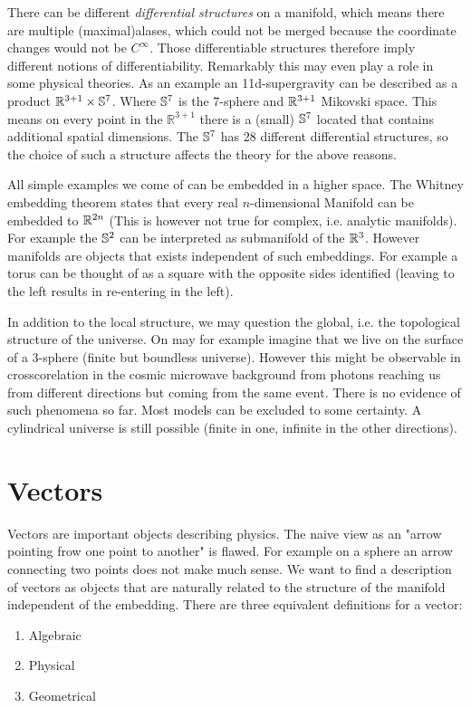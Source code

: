 \begin{sidenote}
There can be different \emph{differential structures} on a manifold, 
which means there are multiple (maximal)alases, which
could not be merged because the coordinate changes would not be $C^\infty$. Those differentiable structures therefore imply different notions of differentiability. 
Remarkably this may even play a role in some physical theories. 
As an example an 11d-supergravity can be described as a product
$\mathbb{R}^{3+1}\times \mathbb{S}^7$.
Where $\mathbb{S}^7$ is the 7-sphere and $\mathbb{R}^{3+1}$ Mikovski space.
This means on every point in the $\mathbb{R}^{3+1}$ there is a (small) $\mathbb{S}^7$  located that contains additional spatial dimensions. 
The $\mathbb{S}^7$ has 28 different differential structures, so the choice of
such a structure affects the theory for the above reasons.
\end{sidenote}
All simple examples we come of can be embedded in a higher space. The Whitney
embedding theorem states that every real $n$-dimensional Manifold
can be embedded to $\mathbb{R}^{2n}$ (This is however not true for complex, i.e. analytic manifolds).
For example the $\mathbb{S}^2$ can be interpreted as submanifold of the $\mathbb{R}^3$.
However manifolds are objects that exists independent of such embeddings. 
For example a torus can be thought of as a square with the opposite sides identified (leaving to the left results in re-entering in the left).
\begin{sidenote}
In addition to the local structure, we may question the global, i.e. the
topological structure of the universe.
On may for example imagine that we live on the surface of a 3-sphere (finite but boundless universe). 
However this might be observable in crosscorelation in the cosmic microwave background from photons reaching us 
from different directions but coming from the same event. There is no evidence of such phenomena so far. 
Most models can be excluded to some certainty. A cylindrical
universe is still possible (finite in one, infinite in the
other directions).
\end{sidenote}
\section{Vectors}
Vectors are important objects describing physics. The naive view as an "arrow pointing frow one point to another" is flawed. 
For example on a sphere an arrow connecting two points does not make much sense.
We want to find a description of vectors as objects that are naturally related to the structure of the manifold independent of the embedding.
There are three equivalent definitions for a vector:
\begin{enumerate}
    \item Algebraic 
    \item Physical
    \item Geometrical 
\end{enumerate}
